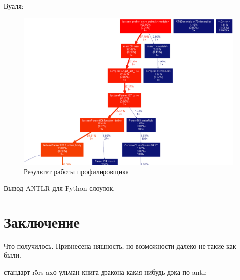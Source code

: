 \documentclass[12pt,a4paper,oneside]{extarticle}
\begin{document}
        Вуаля:

        \begin{figure}[h!]
            \center
            \includegraphics[scale=0.3]{lactose_stats.png}
            \caption{Результат работы профилировщика}
            \label{pic:stats}
        \end{figure}

        Вывод ANTLR для Python слоупок.
    
\clearpage

\section{Заключение}
    Что получилось. Привнесена няшность, но возможности далеко не такие как были.
\clearpage


\begin{thebibliography}{0}
     стандарт r5rs
     axо ульман книга дракона
     какая нибудь дока по antlr

        
\end{thebibliography}
\end{document}
